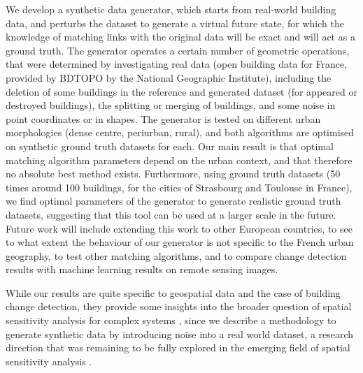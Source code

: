 \documentclass[11pt]{article}
\begin{document}
We develop a synthetic data generator, which starts from real-world building data, and perturbs the dataset to generate a virtual future state, for which the knowledge of matching links with the original data will be exact and will act as a ground truth. The generator operates a certain number of geometric operations, that were determined by investigating real data (open building data for France, provided by BDTOPO by the National Geographic Institute), including the deletion of some buildings in the reference and generated dataset (for appeared or destroyed buildings), the splitting or merging of buildings, and some noise in point coordinates or in shapes. The generator is tested on different urban morphologies (dense centre, periurban, rural), and both algorithms are optimised on synthetic ground truth datasets for each. Our main result is that optimal matching algorithm parameters depend on the urban context, and that therefore no absolute best method exists. Furthermore, using ground truth datasets (50 times around 100 buildings, for the cities of Strasbourg and Toulouse in France), we find optimal parameters of the generator to generate realistic ground truth datasets, suggesting that this tool can be used at a larger scale in the future. Future work will include extending this work to other European countries, to see to what extent the behaviour of our generator is not specific to the French urban geography, to test other matching algorithms, and to compare change detection results with machine learning results on remote sensing images.

While our results are quite specific to geospatial data and the case of building change detection, they provide some insights into the broader question of spatial sensitivity analysis for complex systems \cite{raimbault2019space,raimbault2020scala}, since we describe a methodology to generate synthetic data by introducing noise into a real world dataset, a research direction that was remaining to be fully explored in the emerging field of spatial sensitivity analysis \cite{raimbault2023spatial}.


\small


\end{document}

